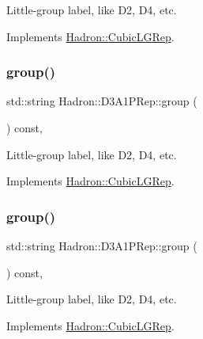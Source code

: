 Little-\/group label, like D2, D4, etc. 

Implements \mbox{\hyperlink{structHadron_1_1CubicLGRep_a9bdb14b519a611d21379ed96a3a9eb41}{Hadron\+::\+Cubic\+L\+G\+Rep}}.

\mbox{\label{structHadron_1_1D3A1PRep_a1c8c6294dd6e9886efa5f3862c77cbcc}} 
\subsubsection{\texorpdfstring{group()}{group()}\hspace{0.1cm}{\footnotesize\ttfamily [2/3]}}
{\footnotesize\ttfamily std\+::string Hadron\+::\+D3\+A1\+P\+Rep\+::group (\begin{DoxyParamCaption}{ }\end{DoxyParamCaption}) const\hspace{0.3cm}{\ttfamily [inline]}, {\ttfamily [virtual]}}

Little-\/group label, like D2, D4, etc. 

Implements \mbox{\hyperlink{structHadron_1_1CubicLGRep_a9bdb14b519a611d21379ed96a3a9eb41}{Hadron\+::\+Cubic\+L\+G\+Rep}}.

\mbox{\label{structHadron_1_1D3A1PRep_a1c8c6294dd6e9886efa5f3862c77cbcc}} 
\subsubsection{\texorpdfstring{group()}{group()}\hspace{0.1cm}{\footnotesize\ttfamily [3/3]}}
{\footnotesize\ttfamily std\+::string Hadron\+::\+D3\+A1\+P\+Rep\+::group (\begin{DoxyParamCaption}{ }\end{DoxyParamCaption}) const\hspace{0.3cm}{\ttfamily [inline]}, {\ttfamily [virtual]}}

Little-\/group label, like D2, D4, etc. 

Implements \mbox{\hyperlink{structHadron_1_1CubicLGRep_a9bdb14b519a611d21379ed96a3a9eb41}{Hadron\+::\+Cubic\+L\+G\+Rep}}.

\mbox{\label{structHadron_1_1D3A1PRep_a264020426c9fd4e916cae2cb95f1dc8b}} 
